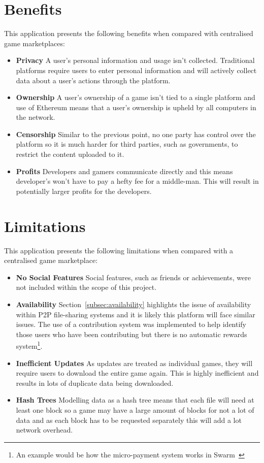 
\section{Benefits}\label{des:benefits}

This application presents the following benefits when compared with centralised game marketplaces:

\begin{itemize}
  \item \textbf{Privacy} A user's personal information and usage isn't collected. Traditional platforms require users to enter personal information and will actively collect data about a user's actions through the platform.
  \item \textbf{Ownership} A user's ownership of a game isn't tied to a single platform and use of Ethereum means that a user's ownership is upheld by all computers in the network.
  \item \textbf{Censorship} Similar to the previous point, no one party has control over the platform so it is much harder for third parties, such as governments, to restrict the content uploaded to it.
  \item \textbf{Profits} Developers and gamers communicate directly and this means developer's won't have to pay a hefty fee for a middle-man. This will result in potentially larger profits for the developers.  
\end{itemize}

\section{Limitations}\label{sec:design-lim}

This application presents the following limitations when compared with a centralised game marketplace:

\begin{itemize}
  \item \textbf{No Social Features} Social features, such as friends or achievements, were not included within the scope of this project.
  \item \textbf{Availability} Section~\ref{subsec:availability} highlights the issue of availability within P2P file-sharing systems and it is likely this platform will face similar issues.
  The use of a contribution system was implemented to help identify those users who have been contributing but there is no automatic rewards system\footnote{An example would be how the micro-payment system works in Swarm~\cite{hartman_swarm_1999}}.
  \item \textbf{Inefficient Updates} As updates are treated as individual games, they will require users to download the entire game again. This is highly inefficient and results in lots of duplicate data being downloaded.
  \item \textbf{Hash Trees} Modelling data as a hash tree means that each file will need at least one block so a game may have a large amount of blocks for not a lot of data and as each block has to be requested separately this will add a lot network overhead. 
\end{itemize}